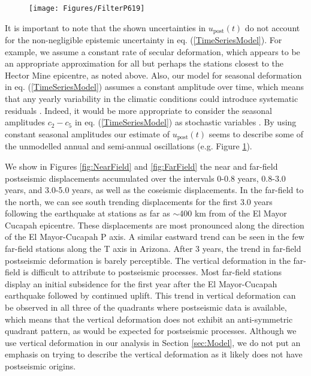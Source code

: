 \documentclass[1p]{elsarticle}
\begin{document}
\begin{figure}
\texttt{[image: Figures/FilterP619]}
\centering
\caption{} 
\label{fig:P619}
\end{figure}

It is important to note that the shown uncertainties in $u_\mathrm{post}(t)$ do not account for the non-negligible epistemic uncertainty in eq. (\ref{TimeSeriesModel}).  For example, we assume a constant rate of secular deformation, which appears to be an appropriate approximation for all but perhaps the stations closest to the Hector Mine epicentre, as noted above.  Also, our model for seasonal deformation in eq. (\ref{TimeSeriesModel}) assumes a constant amplitude over time, which means that any yearly variability in the climatic conditions could introduce systematic residuals \citep{Davis2012}. Indeed, it would be more appropriate to consider the seasonal amplitudes $c_2-c_5$ in eq. (\ref{TimeSeriesModel}) as stochastic variables \citep{Murray2005}. By using constant seasonal amplitudes our estimate of $u_\mathrm{post}(t)$ seems to describe some of the unmodelled annual and semi-annual oscillations (e.g. Figure \ref{fig:P619}).          

We show in Figures \ref{fig:NearField} and \ref{fig:FarField} the near and far-field postseismic displacements accumulated over the intervals  0-0.8 years, 0.8-3.0 years, and 3.0-5.0 years, as well as the coseismic displacements.  In the far-field to the north, we can see south trending displacements for the first 3.0 years following the earthquake at stations as far as $\sim$400 km from of the El Mayor Cucapah epicentre.  These displacements are most pronounced along the direction of the El Mayor-Cucapah P axis. A similar eastward trend can be seen in the few far-field stations along the T axis in Arizona.  After 3 years, the trend in far-field postseismic deformation is barely perceptible.  The vertical deformation in the far-field is difficult to attribute to postseismic processes.  Most far-field stations display an initial subsidence for the first year after the El Mayor-Cucapah earthquake followed by continued uplift.  This trend in vertical deformation can be observed in all three of the quadrants where postseismic data is available, which means that the vertical deformation does not exhibit an anti-symmetric quadrant pattern, as would be expected for postseismic processes.  Although we use vertical deformation in our analysis in Section \ref{sec:Model},  we do not put an emphasis on trying to describe the vertical deformation as it likely does not have postseismic origins.        
\end{document}
